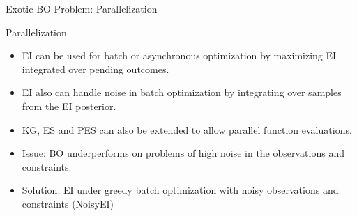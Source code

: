 

\begin{frame}{Exotic BO Problem: Parallelization}
\begin{block}{Parallelization}
\begin{itemize}
    \item EI can be used for batch or asynchronous optimization by maximizing EI integrated over pending outcomes.
    \pause
    \item EI also can handle noise in batch optimization by integrating over samples from the EI posterior.
    \pause
    \item KG, ES and PES can also be extended to allow parallel function evaluations.
    \pause

\end{itemize}
\end{block}
\begin{itemize}
    \item Issue: BO underperforms on problems of high noise in the observations and constraints.
    \item Solution: EI under greedy batch optimization with noisy observations and constraints (NoisyEI)
\end{itemize}
    

\end{frame}
